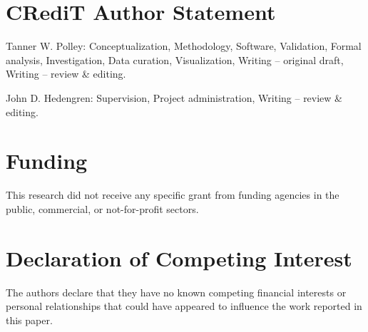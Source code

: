     \section*{CRediT Author Statement}
        Tanner W. Polley: Conceptualization, Methodology, Software, Validation, Formal analysis, Investigation, Data curation, Visualization, Writing -- original draft, Writing -- review \& editing.

        John D. Hedengren: Supervision, Project administration, Writing -- review \& editing.

    \section*{Funding}
        This research did not receive any specific grant from funding agencies in the public, commercial, or not-for-profit sectors.

    \section*{Declaration of Competing Interest}
        The authors declare that they have no known competing financial interests or personal relationships that could have appeared to influence the work reported in this paper.
